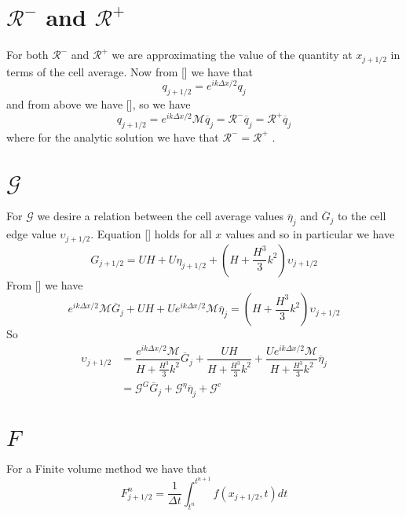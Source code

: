 \documentclass[12pt]{article}
\begin{document}
\section{$\mathcal{R}^-$ and $\mathcal{R}^+$} 
For both $\mathcal{R}^-$ and $\mathcal{R}^+$ we are approximating the value of the quantity at $x_{j+1/2}$ in terms of the cell average. Now from [] we have that
\begin{equation*}
q_{j+1/2} = e^{i {k\Delta x}/{2}}q_{j}
\end{equation*}
and from above we have [], so we have
\begin{equation*}
q_{j+1/2} = e^{i {k\Delta x}/{2}}\mathcal{M}\overline{q}_j = \mathcal{R}^- \overline{q}_j = \mathcal{R}^+ \overline{q}_j
\end{equation*}
where for the analytic solution we have that $\mathcal{R}^-=\mathcal{R}^+$ .
\section{$\mathcal{G}$}
For $\mathcal{G}$ we desire a relation between the cell average values $\overline{\eta}_j$ and $\overline{G}_j$ to the cell edge value $\upsilon_{j+1/2}$. Equation [] holds for all $x$ values and so in particular we have 
\begin{equation}
G_{j+1/2} = UH + U \eta_{j+1/2} + \left(H  + \frac{H^3}{3}k^2\right)\upsilon_{j+1/2}
\end{equation}
From [] we have
\begin{equation}
e^{i {k\Delta x}/{2}}\mathcal{M}\overline{G}_j +  UH + U e^{i {k\Delta x}/{2}}\mathcal{M}\overline{\eta}_j = \left(H  + \frac{H^3}{3}k^2\right)\upsilon_{j+1/2}
\end{equation}
So
\begin{align}
\upsilon_{j+1/2} &=\dfrac{ e^{i {k\Delta x}/{2}}\mathcal{M}}{H  + \frac{H^3}{3}k^2} \overline{G}_j +  \dfrac{UH}{H  + \frac{H^3}{3}k^2} +  \dfrac{U e^{i {k\Delta x}/{2}}\mathcal{M}}{H  + \frac{H^3}{3}k^2}\overline{\eta}_j \\
& = \mathcal{G}^G \overline{G}_j + \mathcal{G}^\eta \overline{\eta}_j + \mathcal{G}^c
\end{align}

\section{$F$}
For a Finite volume method we have that
\begin{equation}
F^n_{j+1/2} = \frac{1}{\Delta t} \int_{t^n}^{t^{n+1}}f(x_{j+1/2},t) dt
\end{equation}
\end{document}
